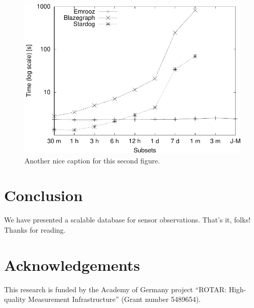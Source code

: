 \documentclass[preprint,12pt,authoryear]{elsarticle}
\begin{document}
\begin{figure}
	\centering
	\includegraphics[scale=0.6]{query-performance-plot.pdf}
	\caption{Another nice caption for this second figure.}
	\label{fig:query-performance-plot}
\end{figure}

\section{Conclusion}
\label{s:conclusion}
We have presented a scalable database for sensor observations. That's it, folks! Thanks for reading.

\section*{Acknowledgements}
\label{s:acknowledgements}
This research is funded by the Academy of Germany project ``ROTAR: High-quality Measurement Infrastructure'' (Grant number 5489654).



 






\end{document}
